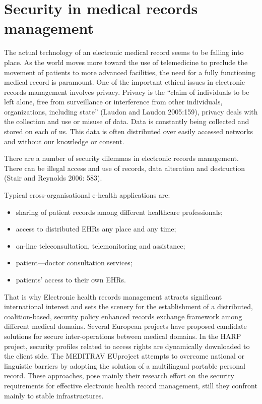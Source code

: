 \section{Security in medical records management}
The actual technology of an electronic medical record seems to be falling into place. As the world moves more toward the use of telemedicine to preclude the movement of patients to more advanced facilities, the need for a fully functioning medical record is paramount.
One of the important ethical issues in electronic records management involves privacy. Privacy is the “claim of individuals to be left alone, free from surveillance or interference from other individuals, organizations, including state” (Laudon and Laudon 2005:159), privacy deals with the collection and use or misuse of data. Data is constantly being collected and stored on each of us. This data is often distributed over easily accessed networks and without our knowledge or consent\cite{ngoepeSecurityPrivacyEthics2011}.
 
 
There are a number of security dilemmas in electronic records management. There can be illegal access and use of records, data alteration and destruction (Stair and Reynolds 2006: 583).

\bigbreak
Typical cross-organisational e-health applications are\cite{ruotsalainenCrossplatformModelSecure2004}: 
\begin{itemize}
\item sharing of patient records among different healthcare professionals; 
\item access to distributed EHRs any place and any time; 
\item on-line teleconsultation, telemonitoring and assistance; 
\item patient—doctor consultation services;
\item patients’ access to their own EHRs.
\end{itemize}

\bigbreak
That is why Electronic health records management attracts significant international interest and sets the scenery for the establishment of a distributed, coalition-based, security policy enhanced records exchange framework among different medical domains. Several European projects have proposed candidate solutions for secure inter-operations between medical domains. In the HARP project, security profiles related to access rights are dynamically downloaded to the client side. The MEDITRAV EUproject attempts to overcome national or linguistic barriers by adopting the solution of a multilingual portable personal record. These approaches, pose mainly their research effort on the security requirements for effective electronic health record management, still they confront mainly to stable infrastructures\cite{belsisPervasiveSecureElectronic2005}.


